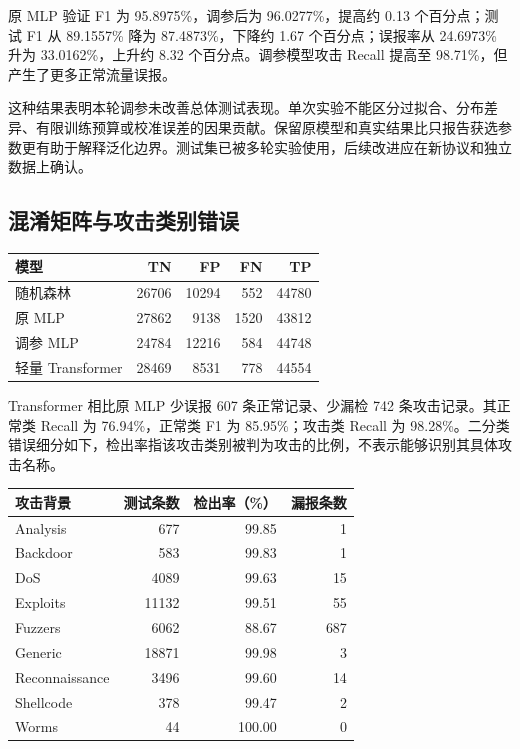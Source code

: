 \documentclass[UTF8,a4paper,11pt,fontset=fandol]{ctexart}
\newcounter{none}
\begin{document}
原 MLP 验证 F1 为 95.8975\%，调参后为 96.0277\%，提高约 0.13
个百分点；测试 F1 从 89.1557\% 降为 87.4873\%，下降约 1.67
个百分点；误报率从 24.6973\% 升为 33.0162\%，上升约 8.32
个百分点。调参模型攻击 Recall 提高至 98.71\%，但产生了更多正常流量误报。

这种结果表明本轮调参未改善总体测试表现。单次实验不能区分过拟合、分布差异、有限训练预算或校准误差的因果贡献。保留原模型和真实结果比只报告获选参数更有助于解释泛化边界。测试集已被多轮实验使用，后续改进应在新协议和独立数据上确认。


\subsection{混淆矩阵与攻击类别错误}\label{ux6df7ux6dc6ux77e9ux9635ux4e0eux653bux51fbux7c7bux522bux9519ux8bef}


{\def\LTcaptype{none} %
\begin{longtable}[]{@{}lrrrr@{}}
\toprule\noalign{}
模型 & TN & FP & FN & TP \\
\midrule\noalign{}
\endhead
\bottomrule\noalign{}
\endlastfoot
随机森林 & 26706 & 10294 & 552 & 44780 \\
原 MLP & 27862 & 9138 & 1520 & 43812 \\
调参 MLP & 24784 & 12216 & 584 & 44748 \\
轻量 Transformer & 28469 & 8531 & 778 & 44554 \\
\end{longtable}
}

Transformer 相比原 MLP 少误报 607 条正常记录、少漏检 742
条攻击记录。其正常类 Recall 为 76.94\%，正常类 F1 为 85.95\%；攻击类
Recall 为
98.28\%。二分类错误细分如下，检出率指该攻击类别被判为攻击的比例，不表示能够识别其具体攻击名称。


{\def\LTcaptype{none} %
\begin{longtable}[]{@{}lrrr@{}}
\toprule\noalign{}
攻击背景 & 测试条数 & 检出率（\%） & 漏报条数 \\
\midrule\noalign{}
\endhead
\bottomrule\noalign{}
\endlastfoot
Analysis & 677 & 99.85 & 1 \\
Backdoor & 583 & 99.83 & 1 \\
DoS & 4089 & 99.63 & 15 \\
Exploits & 11132 & 99.51 & 55 \\
Fuzzers & 6062 & 88.67 & 687 \\
Generic & 18871 & 99.98 & 3 \\
Reconnaissance & 3496 & 99.60 & 14 \\
Shellcode & 378 & 99.47 & 2 \\
Worms & 44 & 100.00 & 0 \\
\end{longtable}
}
\end{document}
